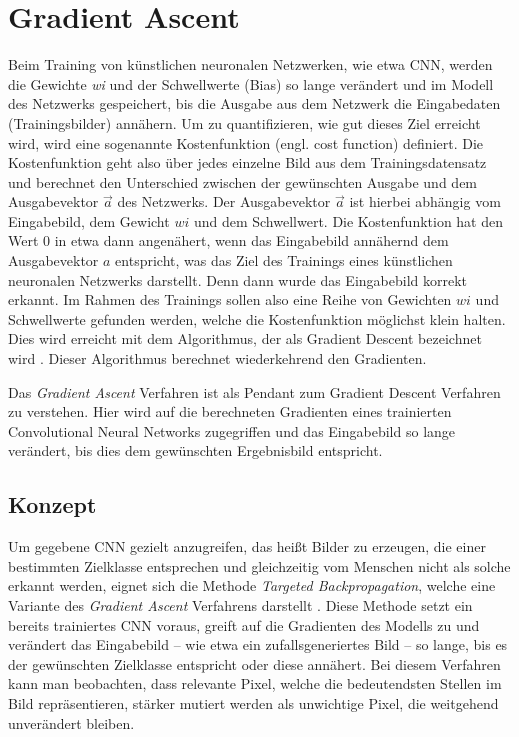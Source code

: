 \chapter{Gradient Ascent}
\label{cha:gascent}

Beim Training von künstlichen neuronalen Netzwerken, wie etwa \ac{CNN}, werden die Gewichte \textit{wi} und der Schwellwerte (Bias) so lange verändert und im Modell des Netzwerks gespeichert, bis die Ausgabe aus dem Netzwerk die Eingabedaten (Trainingsbilder) annähern. Um zu quantifizieren, wie gut dieses Ziel erreicht wird, wird eine sogenannte Kostenfunktion (engl. cost function) definiert. 
Die Kostenfunktion geht also über jedes einzelne Bild aus dem Trainingsdatensatz und berechnet den Unterschied zwischen der gewünschten Ausgabe und dem Ausgabevektor $\vec{a}$ des Netzwerks.
Der Ausgabevektor $\vec{a}$ ist hierbei abhängig vom Eingabebild, dem Gewicht $wi$ und dem Schwellwert.
Die Kostenfunktion hat den Wert 0 in etwa dann angenähert, wenn das Eingabebild annähernd dem Ausgabevektor $a$ entspricht, was das Ziel des Trainings eines künstlichen neuronalen Netzwerks darstellt. Denn dann wurde das Eingabebild korrekt erkannt.
Im Rahmen des Trainings sollen also eine Reihe von Gewichten $wi$ und Schwellwerte gefunden werden, welche die Kostenfunktion möglichst klein halten. 
Dies wird erreicht mit dem Algorithmus, der als Gradient Descent bezeichnet wird \cite{zhou_understanding_2018}.
Dieser Algorithmus berechnet wiederkehrend den Gradienten. 


Das \textit{Gradient Ascent} Verfahren ist als Pendant zum Gradient Descent Verfahren zu verstehen. Hier wird auf die berechneten Gradienten eines trainierten Convolutional Neural Networks zugegriffen und das Eingabebild so lange verändert, bis dies dem gewünschten Ergebnisbild entspricht.


\section{Konzept}
Um gegebene \ac{CNN} gezielt anzugreifen, das heißt Bilder zu erzeugen, die einer bestimmten Zielklasse entsprechen und gleichzeitig vom Menschen nicht als solche erkannt werden, eignet sich die Methode \textit{Targeted Backpropagation}, welche eine Variante des \textit{Gradient Ascent} Verfahrens darstellt \cite{liu_delving_2016}.
Diese Methode setzt ein bereits trainiertes \ac{CNN} voraus, greift auf die Gradienten des Modells zu und verändert das Eingabebild – wie etwa ein zufallsgeneriertes Bild – so lange, bis es der gewünschten Zielklasse entspricht oder diese annähert. 
Bei diesem Verfahren kann man beobachten, dass relevante Pixel, welche die bedeutendsten Stellen im Bild repräsentieren, stärker mutiert werden als unwichtige Pixel, die weitgehend unverändert bleiben.


